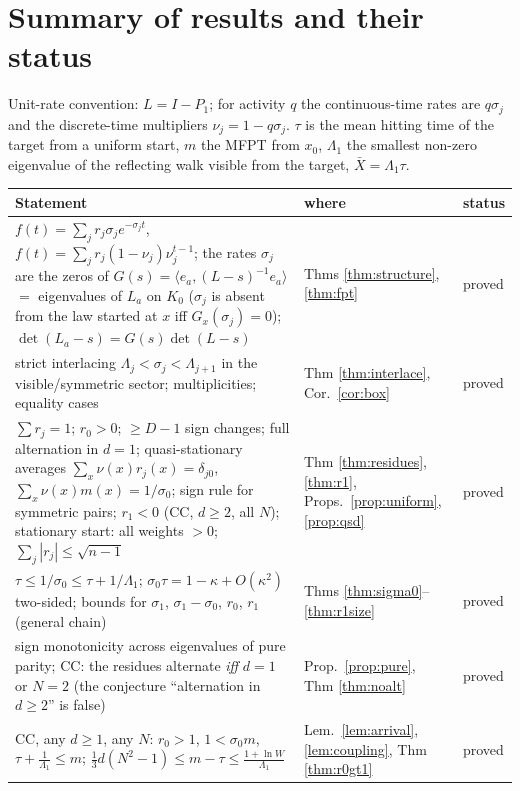\documentclass[11pt,a4paper]{article}
\newcommand{\ip}[2]{\langle #1,#2\rangle}
\newcommand{\Xb}{\bar X}
\theoremstyle{plain}
\theoremstyle{definition}
\numberwithin{equation}{section}
\begin{document}
\section*{Summary of results and their status}
Unit-rate convention: $L=I-P_1$; for activity $q$ the continuous-time rates are $q\sigma_j$ and the discrete-time multipliers $\nu_j=1-q\sigma_j$. $\tau$ is the mean hitting time of the target from a uniform start, $m$ the MFPT from $x_0$, $\Lambda_1$ the smallest non-zero eigenvalue of the reflecting walk visible from the target, $\Xb=\Lambda_1\tau$.
\begin{center}\small
\begin{tabular}{p{}p{}p{}}\toprule
Statement & where & status\\\midrule
$f(t)=\sum_jr_j\sigma_je^{-\sigma_jt}$, $f(t)=\sum_jr_j(1-\nu_j)\nu_j^{t-1}$; the rates $\sigma_j$ are the zeros of $G(s)=\ip{e_a}{(L-s)^{-1}e_a}$ $=$ eigenvalues of $L_a$ on $K_0$ ($\sigma_j$ is absent from the law started at $x$ iff $G_x(\sigma_j)=0$); $\det(L_a-s)=G(s)\det(L-s)$ & Thms \ref{thm:structure}, \ref{thm:fpt} & proved\\
strict interlacing $\Lambda_j<\sigma_j<\Lambda_{j+1}$ in the visible/symmetric sector; multiplicities; equality cases & Thm \ref{thm:interlace}, Cor.\ \ref{cor:box} & proved\\
$\sum r_j=1$; $r_0>0$; $\ge D-1$ sign changes; full alternation in $d=1$; quasi-stationary averages $\sum_x\nu(x)r_j(x)=\delta_{j0}$, $\sum_x\nu(x)m(x)=1/\sigma_0$; sign rule for symmetric pairs; $r_1<0$ (CC, $d\ge2$, all $N$); stationary start: all weights $>0$; $\sum_j|r_j|\le\sqrt{n-1}$ & Thm \ref{thm:residues}, \ref{thm:r1}, Props.\ \ref{prop:uniform}, \ref{prop:qsd} & proved\\
$\tau\le1/\sigma_0\le\tau+1/\Lambda_1$; $\sigma_0\tau=1-\kappa+O(\kappa^2)$ two-sided; bounds for $\sigma_1$, $\sigma_1-\sigma_0$, $r_0$, $r_1$ (general chain) & Thms \ref{thm:sigma0}--\ref{thm:r1size} & proved\\
sign monotonicity across eigenvalues of pure parity; CC: the residues alternate \emph{iff} $d=1$ or $N=2$ (the conjecture ``alternation in $d\ge2$'' is false) & Prop.\ \ref{prop:pure}, Thm \ref{thm:noalt} & proved\\
CC, any $d\ge1$, any $N$: $r_0>1$, $1<\sigma_0m$, $\tau+\frac1{\Lambda_1}\le m$; $\frac13d(N^2-1)\le m-\tau\le\frac{1+\ln W}{\Lambda_1}$ & Lem.\ \ref{lem:arrival}, \ref{lem:coupling}, Thm \ref{thm:r0gt1} & proved\\

\end{tabular}
\end{center}
\end{document}
